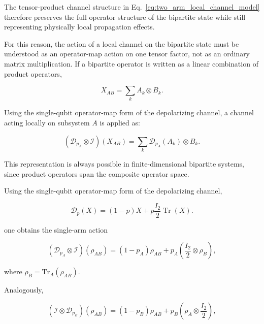 \medskip

The tensor-product channel structure in Eq.~\eqref{eq:two_arm_local_channel_model} therefore preserves the full operator structure of the bipartite state while still representing physically local propagation effects.

\medskip

For this reason, the action of a local channel on the bipartite state must be understood as an operator-map action on one tensor factor, not as an ordinary matrix multiplication. If a bipartite operator is written as a linear combination of product operators,

\[
X_{AB}
=
\sum_k
A_k\otimes B_k.
\]

Using the single-qubit operator-map form of the depolarizing channel, a channel acting locally on subsystem \( A \) is applied as:

\begin{equation}
\left(
\mathcal{D}_{p_A}
\otimes
\mathcal{I}
\right)
(X_{AB})
=
\sum_k
\mathcal{D}_{p_A}(A_k)
\otimes
B_k.
\label{eq:local_channel_operator_action}
\end{equation}

This representation is always possible in finite-dimensional bipartite systems, since product operators span the composite operator space.

\medskip

Using the single-qubit operator-map form of the depolarizing channel,

\begin{equation}
\mathcal{D}_{p}(X)
=
(1-p)X
+
p\frac{I_2}{2}
\operatorname{Tr}(X).
\label{eq:single_qubit_depolarizing_operator_map}
\end{equation}

one obtains the single-arm action

\begin{equation}
\left(
\mathcal{D}_{p_A}
\otimes
\mathcal{I}
\right)
(\rho_{AB})
=
(1-p_A)\rho_{AB}
+
p_A
\left(
\frac{I_2}{2}
\otimes
\rho_B
\right),
\label{eq:single_arm_depolarization_A}
\end{equation}

where
\(
\rho_B 
=
\mathrm{Tr}_A(\rho_{AB}
).
\)

\medskip

Analogously,

\begin{equation}
\left(
\mathcal{I}
\otimes
\mathcal{D}_{p_B}
\right)
(\rho_{AB})
=
(1-p_B)\rho_{AB}
+
p_B
\left(
\rho_A
\otimes
\frac{I_2}{2}
\right),
\label{eq:single_arm_depolarization_B}
\end{equation}

